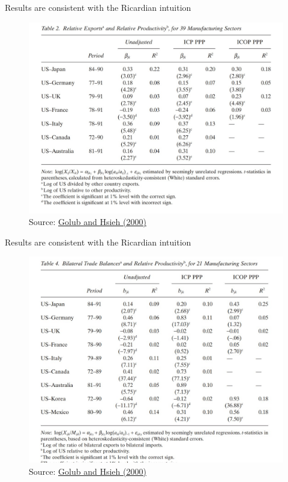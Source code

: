\documentclass[notes,11pt, aspectratio=169, xcolor=table]{beamer}
\begin{document}
\begin{frame}{Results are consistent with the Ricardian intuition}
    \begin{figure}
        \centering
        \includegraphics[width=0.6\linewidth]{figs/golub-hsieh.jpg}
        \caption{Source: \href{https://onlinelibrary.wiley.com/doi/epdf/10.1111/1467-9396.00217}{Golub and Hsieh (2000)} }
        \label{fig:golub}
    \end{figure}
\end{frame}

\begin{frame}{Results are consistent with the Ricardian intuition}
    \begin{figure}
        \centering
        \includegraphics[width=0.5\linewidth]{figs/golub-hsieh3.jpg}
        \caption{Source: \href{https://onlinelibrary.wiley.com/doi/epdf/10.1111/1467-9396.00217}{Golub and Hsieh (2000)} }
        \label{fig:golub2}
    \end{figure}
\end{frame}
\end{document}
